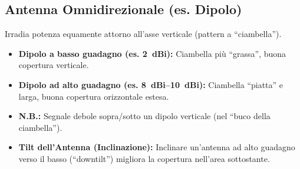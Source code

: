 \subsection{Antenna Omnidirezionale (es. Dipolo)}
Irradia potenza equamente attorno all'asse verticale (pattern a ``ciambella'').
\begin{itemize}
    \item \textbf{Dipolo a basso guadagno (es. \SI{2}{dBi}):} Ciambella più ``grassa'', buona copertura verticale.
    \item \textbf{Dipolo ad alto guadagno (es. \SIrange{8}{10}{dBi}):} Ciambella ``piatta'' e larga, buona copertura orizzontale estesa.
    \item \textbf{N.B.:} Segnale debole sopra/sotto un dipolo verticale (nel ``buco della ciambella'').
    \item \textbf{Tilt dell'Antenna (Inclinazione):} Inclinare un'antenna ad alto guadagno verso il basso (``downtilt'') migliora la copertura nell'area sottostante.
\end{itemize}
